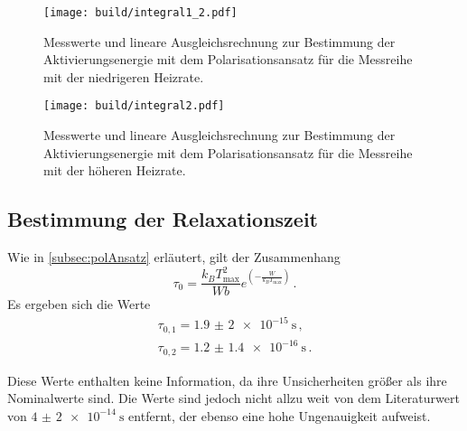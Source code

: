 \begin{figure}
  \centering
  \texttt{[image: build/integral1\_2.pdf]}
  \caption{Messwerte und lineare Ausgleichsrechnung zur Bestimmung der Aktivierungsenergie mit dem Polarisationsansatz für
  die Messreihe mit der niedrigeren Heizrate.}
  \label{fig:integral1_2}
\end{figure}
\begin{figure}
  \centering
  \texttt{[image: build/integral2.pdf]}
  \caption{Messwerte und lineare Ausgleichsrechnung zur Bestimmung der Aktivierungsenergie mit dem Polarisationsansatz für
  die Messreihe mit der höheren Heizrate.}
  \label{fig:integral2}
\end{figure}

\subsection{Bestimmung der Relaxationszeit}

Wie in \ref{subsec:polAnsatz} erläutert, gilt der Zusammenhang
\begin{equation*}
	\tau_0=\frac{k_B T_{\text{max}}^2}{W b} e^{\left(-\frac{W}{k_B T_{\text{max}}}\right)} \,.
\end{equation*}
Es ergeben sich die Werte
\begin{align*}
	\tau_{0,1}=\SI{1.9(20)e-15}{\second} \,, \\
	\tau_{0,2}=\SI{1.2(14)e-16}{\second} \,.
\end{align*}

Diese Werte enthalten keine Information, da ihre Unsicherheiten größer als ihre Nominalwerte sind. Die Werte sind jedoch nicht allzu weit von dem Literaturwert von $\SI{4(2)e-14}{\second}$ \cite{lit} entfernt, der ebenso eine hohe Ungenauigkeit aufweist.

